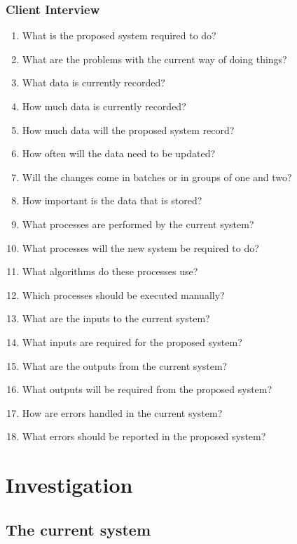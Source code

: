 \subsubsection{Client Interview}
\begin{enumerate}
	\item What is the proposed system required to do?
	\item What are the problems with the current way of doing things?
	\item What data is currently recorded?
	\item How much data is currently recorded?
	\item How much data will the proposed system record?
	\item How often will the data need to be updated?
	\item Will the changes come in batches or in groups of one and two?
	\item How important is the data that is stored?
	\item What processes are performed by the current system?
	\item What processes will the new system be required to do?
	\item What algorithms do these processes use?
	\item Which processes should be executed manually?
	\item What are the inputs to the current system?
	\item What inputs are required for the proposed system?
	\item What are the outputs from the current system?
	\item What outputs will be required from the proposed system?
	\item How are errors handled in the current system?
	\item What errors should be reported in the proposed system?
\end{enumerate}

\section{Investigation}

\subsection{The current system}

